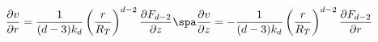 \begin{equation}
\label{pavr}
\frac{\partial v}{\partial r}
= \frac{1}{(d-3)k_d}  \left( \frac{r}{R_T} \right)^{d-2}
\frac{\partial F_{d-2}}{\partial z} \spa
\frac{\partial v}{\partial z}
= - \frac{1}{(d-3)k_d} \left( \frac{r}{R_T} \right)^{d-2}
\frac{\partial F_{d-2}}{\partial r}
\end{equation}

